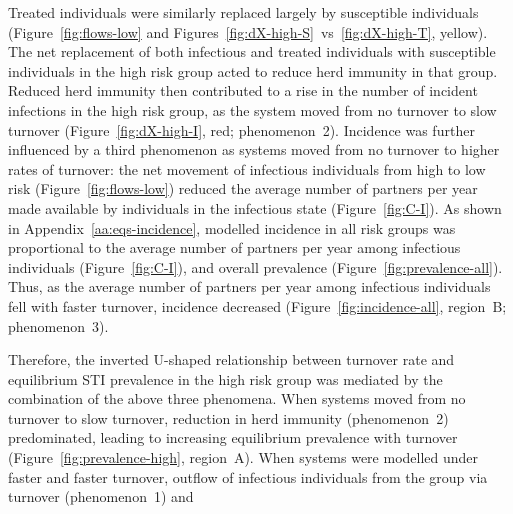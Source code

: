 Treated individuals were similarly replaced largely by susceptible individuals
(Figure~\ref{fig:flows-low} and
Figures~\ref{fig:dX-high-S}~vs~\ref{fig:dX-high-T}, yellow).
The net replacement of both infectious and treated individuals with susceptible individuals
in the high risk group acted to reduce herd immunity in that group.
Reduced herd immunity then contributed to a rise in
the number of incident infections in the high risk group,
as the system moved from no turnover to slow turnover
(Figure~\ref{fig:dX-high-I}, red; phenomenon~2).
Incidence was further influenced by a third phenomenon
as systems moved from no turnover to higher rates of turnover:
the net movement of infectious individuals
from high to low risk (Figure~\ref{fig:flows-low})
reduced the average number of partners per year made available by
individuals in the infectious state (Figure~\ref{fig:C-I}).
As shown in Appendix~\ref{aa:eqs-incidence},
modelled incidence in all risk groups was proportional to
the average number of partners per year among infectious individuals
(Figure~\ref{fig:C-I}),
and overall prevalence
(Figure~\ref{fig:prevalence-all}).
Thus, as the average number of partners per year among infectious individuals
fell with faster turnover, incidence decreased
(Figure~\ref{fig:incidence-all}, region~B; phenomenon~3).
\par
Therefore, the inverted U-shaped relationship between turnover rate
and equilibrium STI prevalence in the high risk group was mediated
by the combination of the above three phenomena.
When systems moved from no turnover to slow turnover,
reduction in herd immunity (phenomenon~2) predominated,
leading to increasing equilibrium prevalence with turnover
(Figure~\ref{fig:prevalence-high}, region~A).
When systems were modelled under faster and faster turnover,
outflow of infectious individuals from the group via turnover (phenomenon~1) and
